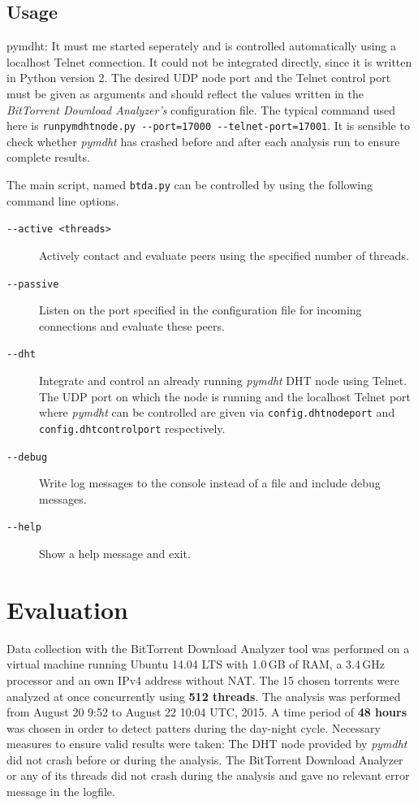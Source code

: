 \documentclass[10pt, a4paper, twoside, headsepline]{scrbook}
\renewcommand{\_}{\origunderscore\allowbreak}
\newcommand{\config}[1]{\texttt{config.\allowbreak #1}}
\newcommand{\range}{from August 20 9:52 to August 22 10:04 UTC, 2015} %
\begin{document}
\section{Usage}
pymdht: It must me started seperately and is controlled automatically using a localhost Telnet connection. It could not be integrated directly, since it is written in Python version 2. The desired UDP node port and the Telnet control port must be given as arguments and should reflect the values written in the \emph{BitTorrent Download Analyzer's} configuration file. The typical command used here is \texttt{run\_pymdht\_node.py -{}-port=17000 -{}-telnet-port=17001}. It is sensible to check whether \emph{pymdht} has crashed before and after each analysis run to ensure complete results.

The main script, named \texttt{btda.py} can be controlled by using the following command line options.

\begin{description}
  \item[\texttt{-{}-active <threads>}] Actively contact and evaluate peers using the specified number of threads.
  \item[\texttt{-{}-passive}] Listen on the port specified in the configuration file for incoming connections and evaluate these peers.
  \item[\texttt{-{}-dht}] Integrate and control an already running \emph{pymdht} \cite{pymdht} DHT node using Telnet. The UDP port on which the node is running and the localhost Telnet port where \emph{pymdht} can be controlled are given via \config{dht\_node\_port} and \config{dht\_control\_port} respectively.
  \item[\texttt{-{}-debug}] Write log messages to the console instead of a file and include debug messages.
  \item[\texttt{-{}-help}] Show a help message and exit.
\end{description}

\chapter{Evaluation}
Data collection with the BitTorrent Download Analyzer tool was performed on a virtual machine running Ubuntu 14.04 LTS with 1.0\,GB of RAM, a 3.4\,GHz processor and an own IPv4 address without NAT. The 15 chosen torrents were analyzed at once concurrently using \textbf{512 threads}. The analysis was performed \range. A time period of \textbf{48 hours} was chosen in order to detect patters during the day-night cycle. Necessary measures to ensure valid results were taken: The DHT node provided by \emph{pymdht} did not crash before or during the analysis. The BitTorrent Download Analyzer or any of its threads did not crash during the analysis and gave no relevant error message in the logfile.
\end{document}

